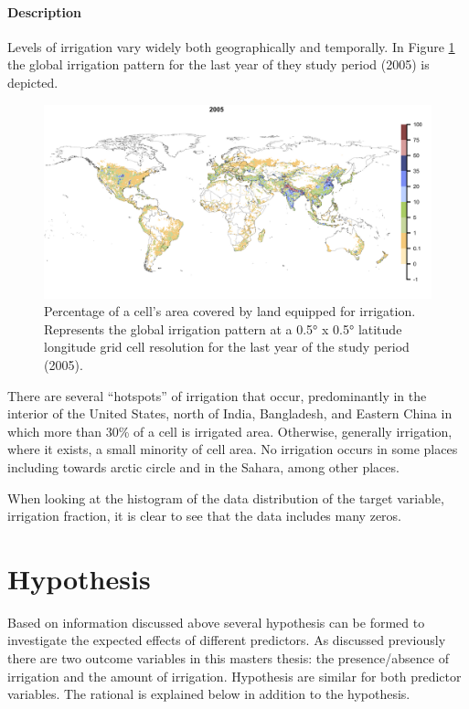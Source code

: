 \documentclass[12pt,twoside]{reedthesis}
\begin{document}
\hypertarget{irrfracdesc}{%
\paragraph{Description}\label{irrfracdesc}}

Levels of irrigation vary widely both geographically and temporally. In Figure \ref{fig:irrfrac2005} the global irrigation pattern for the last year of they study period (2005) is depicted.
\begin{figure}
\includegraphics[width=1000px]{figure/irrfrac2005} \caption{Percentage of a cell's area covered by land equipped for irrigation. Represents the global irrigation pattern at a 0.5° x 0.5° latitude longitude grid cell resolution for the last year of the study period (2005).}\label{fig:irrfrac2005}
\end{figure}
There are several ``hotspots'' of irrigation that occur, predominantly in the interior of the United States, north of India, Bangladesh, and Eastern China in which more than 30\% of a cell is irrigated area. Otherwise, generally irrigation, where it exists, a small minority of cell area. No irrigation occurs in some places including towards arctic circle and in the Sahara, among other places.

When looking at the histogram of the data distribution of the target variable, irrigation fraction, it is clear to see that the data includes many zeros.

\hypertarget{hypothesis}{%
\section{Hypothesis}\label{hypothesis}}

Based on information discussed above several hypothesis can be formed to investigate the expected effects of different predictors. As discussed previously there are two outcome variables in this masters thesis: the presence/absence of irrigation and the amount of irrigation. Hypothesis are similar for both predictor variables. The rational is explained below in addition to the hypothesis.
\end{document}
